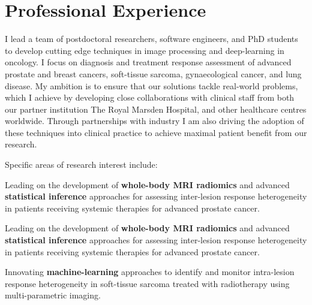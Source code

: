 \documentclass[]{mbcv}
\begin{document}
\begin{minipage}[t]{0.65\textwidth}

\section{Professional Experience}

I lead a team of postdoctoral researchers, software engineers, and PhD students to develop cutting edge techniques in image processing and deep-learning in oncology. I focus on diagnosis and treatment response assessment of advanced prostate and breast cancers, soft-tissue sarcoma, gynaecological cancer, and lung disease. My ambition is to ensure that our solutions tackle real-world problems, which I achieve by developing close collaborations with clinical staff from both our partner institution The Royal Marsden Hospital, and other healthcare centres worldwide.  Through partnerships with industry I am also driving the adoption of these techniques into clinical practice to achieve maximal patient benefit from our research.

\vspace{5pt}
Specific areas of research interest include:

\vspace{10pt}
\begin{tightemize}

\item Leading on the development of \textbf{whole-body MRI radiomics} and advanced \textbf{statistical inference} approaches for assessing inter-lesion response heterogeneity in patients receiving systemic therapies for advanced prostate cancer.

\end{tightemize}

\sectionsep

\vspace*{10pt}

\begin{tightemize}

\item Leading on the development of \textbf{whole-body MRI radiomics} and advanced \textbf{statistical inference} approaches for assessing inter-lesion response heterogeneity in patients receiving systemic therapies for advanced prostate cancer.

\item Innovating \textbf{machine-learning} approaches to identify and monitor intra-lesion response heterogeneity in soft-tissue sarcoma treated with radiotherapy using multi-parametric imaging.


\end{tightemize}
\end{minipage}
\end{document}
